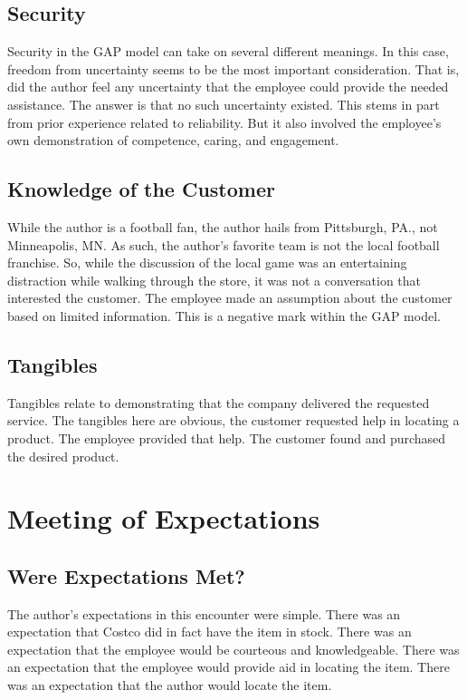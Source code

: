 \documentclass[man]{apa7}
\begin{document}
\subsection{Security}
\label{sec:org7a76c1a}

Security in the GAP model can take on several different meanings. In this case, freedom from uncertainty seems to be the most important consideration. That is, did the author feel any uncertainty that the employee could provide the needed assistance. The answer is that no such uncertainty existed. This stems in part from prior experience related to reliability. But it also involved the employee's own demonstration of competence, caring, and engagement.

\subsection{Knowledge of the Customer}
\label{sec:orgd1392c5}

While the author is a football fan, the author hails from Pittsburgh, PA., not Minneapolis, MN. As such, the author's favorite team is not the local football franchise. So, while the discussion of the local game was an entertaining distraction while walking through the store, it was not a conversation that interested the customer. The employee made an assumption about the customer based on limited information. This is a negative mark within the GAP model.

\subsection{Tangibles}
\label{sec:org5bc3566}

Tangibles relate to demonstrating that the company delivered the requested service. The tangibles here are obvious, the customer requested help in locating a product. The employee provided that help. The customer found and purchased the desired product.

\section{Meeting of Expectations}
\label{sec:org33f5739}

\subsection{Were Expectations Met?}
\label{sec:org324e65a}

The author's expectations in this encounter were simple. There was an expectation that Costco did in fact have the item in stock. There was an expectation that the employee would be courteous and knowledgeable. There was an expectation that the employee would provide aid in locating the item. There was an expectation that the author would locate the item.
\end{document}
